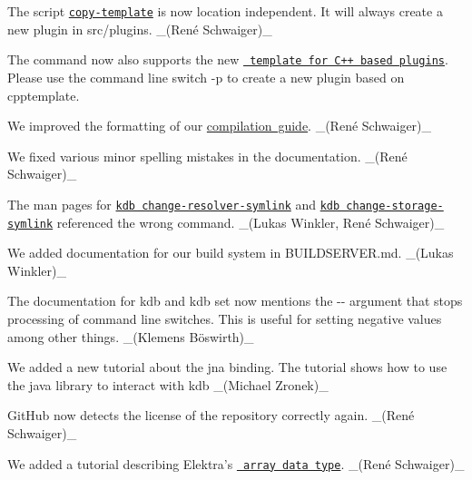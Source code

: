 \begin{DoxyItemize}
\item The script \href{https://master.libelektra.org/scripts/dev/copy-template}{\texttt{ {\ttfamily copy-\/template}}} is now location independent. It will always create a new plugin in {\ttfamily src/plugins}. \+\_\+(René Schwaiger)\+\_\+
\item The command now also supports the new \href{https://www.libelektra.org/plugins/cpptemplate}{\texttt{ template for C++ based plugins}}. Please use the command line switch {\ttfamily -\/p} to create a new plugin based on {\ttfamily cpptemplate}.
\end{DoxyItemize}


\begin{DoxyItemize}
\item We improved the formatting of our \mbox{\hyperlink{doc_COMPILE_md}{compilation guide}}. \+\_\+(René Schwaiger)\+\_\+
\item We fixed various minor spelling mistakes in the documentation. \+\_\+(René Schwaiger)\+\_\+
\item The man pages for \href{https://www.libelektra.org/manpages/kdb-change-resolver-symlink}{\texttt{ {\ttfamily kdb change-\/resolver-\/symlink}}} and \href{https://www.libelektra.org/manpages/kdb-change-storage-symlink}{\texttt{ {\ttfamily kdb change-\/storage-\/symlink}}} referenced the wrong command. \+\_\+(Lukas Winkler, René Schwaiger)\+\_\+
\item We added documentation for our build system in B\+U\+I\+L\+D\+S\+E\+R\+V\+ER.md. \+\_\+(\+Lukas Winkler)\+\_\+
\item The documentation for {\ttfamily kdb} and {\ttfamily kdb set} now mentions the {\ttfamily -\/-\/} argument that stops processing of command line switches. This is useful for setting negative values among other things. \+\_\+(Klemens Böswirth)\+\_\+
\item We added a new tutorial about the jna binding. The tutorial shows how to use the java library to interact with kdb \+\_\+(\+Michael Zronek)\+\_\+
\item Git\+Hub now detects the license of the repository correctly again. \+\_\+(René Schwaiger)\+\_\+
\item We added a tutorial describing Elektra’s \href{https://www.libelektra.org/tutorials/arrays}{\texttt{ array data type}}. \+\_\+(René Schwaiger)\+\_\+
\end{DoxyItemize}



